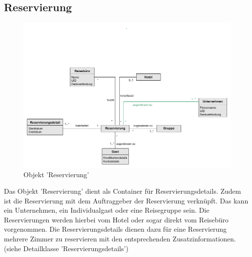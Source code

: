 \documentclass[../../Pflichtenheft.tex]{subfiles}
\begin{document}
    \subsection{Reservierung}
        \begin{figure}[ht!]
            \begin{center}
                \includegraphics[width=0.7\linewidth]{assets/reservierung.png}
                \caption{Objekt 'Reservierung'} \label{reservierung_model}
            \end{center}
        \end{figure}Das Objekt 'Reservierung' dient als Container für Reservierungsdetails. Zudem
    ist die Reservierung mit dem Auftraggeber der Reservierung verknüpft. Das kann
    ein Unternehmen, ein Individualgast oder eine Reisegruppe sein. Die Reservierungen
    werden hierbei vom Hotel oder sogar direkt vom Reisebüro vorgenommen. Die Reservierungsdetails
    dienen dazu für eine Reservierung mehrere Zimmer zu reservieren mit den entsprechenden Zusatzinformationen.
    (siehe Detailklasse 'Reservierungsdetails')
\end{document}
